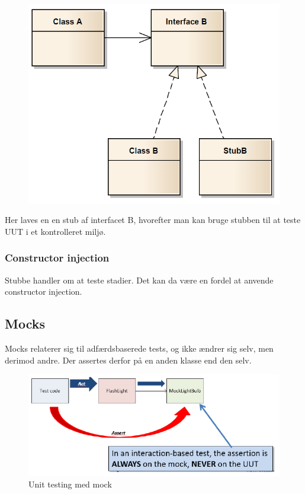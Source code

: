 \begin{figure}[H]
	\centering
	\includegraphics[width=0.7\linewidth]{figs/stubInterface.PNG}
	\caption{}
	\label{fig:stubInterface}
\end{figure}

Her laves en en stub af interfacet B, hvorefter man kan bruge stubben til at teste UUT i et kontrolleret miljø.

\subsubsection{Constructor injection}
Stubbe handler om at teste stadier. Det kan da være en fordel at anvende constructor injection.



\subsection{Mocks}
Mocks relaterer sig til adfærdsbaserede tests, og ikke ændrer sig selv, men derimod andre. Der assertes derfor på en anden klasse end den selv.

\begin{figure}
\centering
\includegraphics[width=0.7\linewidth]{figs/mockTest.PNG}
\caption{Unit testing med mock}
\label{fig:mockTest}
\end{figure}
